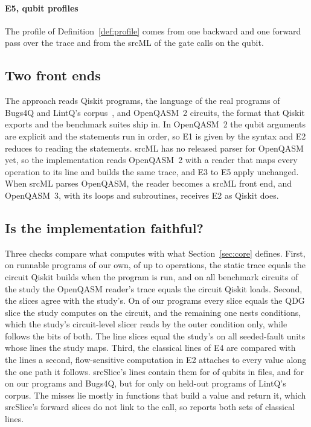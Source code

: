 \paragraph*{E5, qubit profiles}
The profile of Definition~\ref{def:profile} comes from one backward and one forward pass over the trace and from
the srcML of the gate calls on the qubit.

\subsection{Two front ends}
The approach reads Qiskit programs, the language of the real programs of Bugs4Q and LintQ's
corpus~\cite{zhao2023bugs4q, paltenghi2024lintq}, and OpenQASM~2 circuits, the format that Qiskit exports and the
benchmark suites ship in. In OpenQASM~2 the qubit arguments are explicit and the statements run in order, so E1 is
given by the syntax and E2 reduces to reading the statements. srcML has no released parser for OpenQASM yet, so
the implementation reads OpenQASM~2 with a reader that maps every operation to its line and builds the same trace,
and E3 to E5 apply unchanged. When srcML parses OpenQASM, the reader becomes a srcML front end, and OpenQASM~3, with
its loops and subroutines, receives E2 as Qiskit does.

\subsection{Is the implementation faithful?}
Three checks compare what \tool{} computes with what Section~\ref{sec:core} defines. First, on \numToolDevPrograms{}
runnable programs of our own, of up to \numToolDevMaxOps{} operations, the static trace equals the circuit Qiskit
builds when the program is run, and on all \numQasmCircuitsChecked{} benchmark circuits of the study the OpenQASM
reader's trace equals the circuit Qiskit loads. Second, the slices agree with the study's. On
\numToolDevSliceEqual{} of our programs every slice equals the QDG slice the study computes on the circuit, and the
remaining one nests conditions, which the study's circuit-level slicer reads by the outer condition only, while
\tool{} follows the bits of both. The line slices equal the study's on all
\numToolTTwoUnits{} seeded-fault units whose lines the study maps. Third, the classical lines of E4 are compared
with the lines a second, flow-sensitive computation in E2 attaches to every value along the one path it follows.
srcSlice's lines contain them for \numSsContainPct{} of \numSsQubits{} qubits in \numSsFiles{} files, and for
\numSsDevBugsContainPct{} on our programs and Bugs4Q, but for only \numSsHeldContainPct{} on \numSsHeldFiles{}
held-out programs of LintQ's corpus. The misses lie mostly in functions that build a value and return it, which
srcSlice's forward slices do not link to the call, so \tool{} reports both sets of classical lines.

